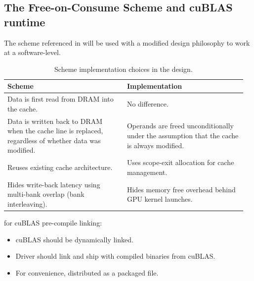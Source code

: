 \documentclass[a4paper]{article}
\begin{document}
	\subsection{The Free-on-Consume Scheme and cuBLAS runtime}
	The scheme referenced in \cite{DybdahlKGN06} will be used with a modified design philosophy to work at a software-level.
	\begin{table}[htbp]
  \centering
  \caption{Scheme implementation choices in the design.}
  \label{tab:scheme_implementation}
  \small
  \begin{tabular}{@{}>{\RaggedRight}p{0.48\linewidth} >{\RaggedRight}p{0.48\linewidth}@{}}
    \toprule
    \textbf{Scheme} & \textbf{Implementation} \\
    \midrule
    Data is first read from DRAM into the cache. 
      & No difference. \\ \addlinespace
    
    Data is written back to DRAM when the cache line is replaced, regardless of whether data was modified. 
      & Operands are freed unconditionally under the assumption that the cache is always modified. \\ \addlinespace
    
    Reuses existing cache architecture. 
      & Uses scope-exit allocation for cache management. \\ \addlinespace
    
    Hides write-back latency using multi-bank overlap (bank interleaving). 
      & Hides memory free overhead behind GPU kernel launches. \\
    \bottomrule
  \end{tabular}
\end{table}

	for cuBLAS pre-compile linking:
	\begin{itemize}
		\item cuBLAS should be dynamically linked.
		\item Driver should link and ship with compiled binaries from cuBLAS.
		\item For convenience, distributed as a packaged file.
	\end{itemize}

	
\end{document}
